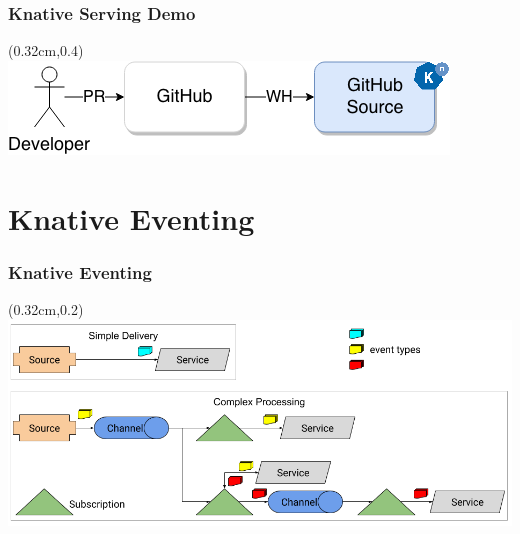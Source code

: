 \documentclass[aspectratio=169,11pt,hyperref={colorlinks=true}]{beamer}
\begin{document}
\begin{lblackrwhiteframe}
\begin{lblackrwhiteframe}

\begin{tblackbgrayframe}
  \frametitle{Knative Serving Demo}
  \begin{textblock*}{\paperwidth}(0.32cm,0.4\paperheight)
    \centering
    \includegraphics[width=0.65\paperwidth]{img/knative-serving-demo.png}
  \end{textblock*}
\end{tblackbgrayframe}

\section{Knative Eventing}

\begin{tblackbgrayframe}
  \frametitle{Knative Eventing}
  \begin{textblock*}{\paperwidth}(0.32cm,0.2\paperheight)
    \centering
    \includegraphics[width=0.9\paperwidth]{img/eventing-control-plane.png}
  \end{textblock*}
\end{tblackbgrayframe}



\end{lblackrwhiteframe}
\end{lblackrwhiteframe}
\end{document}
